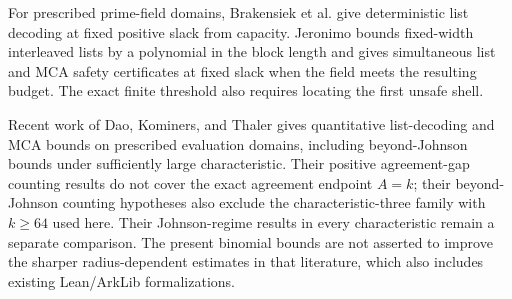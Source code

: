 For prescribed prime-field domains, Brakensiek et al.
\cite{brakensiekEtAl2026algorithmic} give deterministic list decoding at
fixed positive slack from capacity. Jeronimo \cite[Sections~8.2--8.4]{jeronimo2026algorithmic}
bounds fixed-width interleaved lists by a polynomial in the block length
and gives simultaneous list and MCA safety certificates at fixed slack
when the field meets the resulting budget. The exact finite threshold also
requires locating the first unsafe shell.

Recent work of Dao, Kominers, and Thaler \cite{daoKominersThaler2026}
gives quantitative list-decoding and MCA bounds on prescribed evaluation
domains, including beyond-Johnson bounds under sufficiently large
characteristic. Their positive agreement-gap counting results do not cover
the exact agreement endpoint \(A=k\); their beyond-Johnson counting
hypotheses also exclude the characteristic-three family with \(k\ge64\)
used here. Their Johnson-regime results in every characteristic remain a
separate comparison. The present binomial bounds are not asserted to improve
the sharper radius-dependent estimates in that literature, which also
includes existing Lean/ArkLib formalizations.

